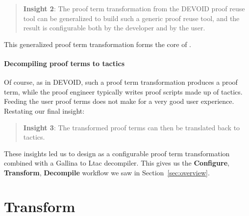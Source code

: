 \begin{quote}
\textbf{Insight 2}:
The proof term transformation from the \textsc{DEVOID} proof reuse tool can be generalized
to build such a generic proof reuse tool, and the result is configurable both by the developer and by the user.
\end{quote}
This generalized proof term transformation forms the core of \toolname.

\paragraph{Decompiling proof terms to tactics}

Of course, as in \textsc{DEVOID}, such a proof term transformation produces a proof term,
while the proof engineer typically writes proof scripts made up of tactics.
Feeding the user proof terms does not make for a very good user experience.
Restating our final insight:

\begin{quote}
\textbf{Insight 3}: The transformed proof terms can then be translated back to tactics.
\end{quote} 

These insights led us to design \toolname as a configurable proof term transformation
combined with a Gallina to Ltac decompiler.
This gives us the \textbf{Configure}, \textbf{Transform}, \textbf{Decompile} workflow we saw in Section~\ref{sec:overview}.

\section{Transform}
\label{sec:meat}

